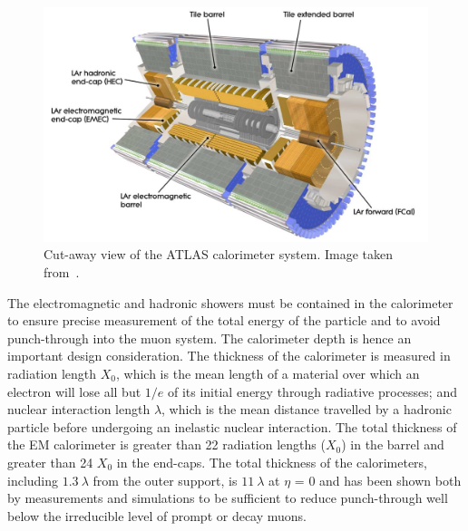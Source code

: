 \begin{figure}[bht]
	\begin{centering}	
	\includegraphics[width=1.0\textwidth]{Detector_plots/calo.png}
	\caption{Cut-away view of the ATLAS calorimeter system. Image taken from~\cite{ATLAS-TDR-01}.}
	\label{fig:calo}
	\end{centering}
\end{figure}
The electromagnetic and hadronic showers must be contained in the 
calorimeter to ensure precise measurement of the total energy of the particle
and to avoid punch-through into the muon system. 
The calorimeter depth is hence an important design consideration. 
The thickness of the calorimeter is measured in radiation length $X_0$,
which is the mean length of a material over which an electron will lose all but $1/e$ 
of its initial energy through radiative processes; and nuclear interaction length $\lambda$,
which is the mean distance travelled by a hadronic particle before undergoing
an inelastic nuclear interaction. 
The total thickness of the EM calorimeter is greater than
22 radiation lengths ($X_0$) in the barrel and greater than 
24 $X_0$ in the end-caps.
The total thickness of the calorimeters, 
including $1.3\ \lambda$ from the outer support, is $11\ \lambda$
at $\eta$ = 0 and has been shown both by measurements and simulations 
to be sufficient to reduce punch-through well below the irreducible 
level of prompt or decay muons. 


